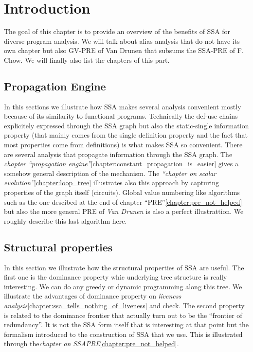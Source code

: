 \chapter{Introduction }
\label{chapter:analysis}

The goal of this chapter is to provide an overview of the benefits of SSA for diverse program analysis.
We will talk about alias analysis that do not have its own chapter but also GV-PRE of Van Drunen that subsums the SSA-PRE of F. Chow.
We will finally also list the chapters of this part.

\section{Propagation Engine}
In this sections we illustrate how SSA makes several analysis convenient mostly because of its similarity to functional programs. 
Technically the def-use chains explicitely expressed through the SSA graph but also the static-single information property (that mainly comes from the single definition property and the fact that most properties come from definitions) is what makes SSA so convenient.
There are several analysis that propagate information through the SSA graph.
The \emph{chapter ``propagation engine''}\ref{chapter:constant_propagation_is_easier} gives a somehow general description of the mechanism.
The \emph{``chapter on scalar evolution''}\ref{chapter:loop_tree} illustrates also this approach by capturing properties of the graph itself (circuits).
Global value numbering like algorithms such as the one descibed at the end of chapter ``PRE''\ref{chapter:pre_not_helped} but also the more general PRE of \emph{Van Drunen} is also a perfect illustrattion.
We roughly describe this last algorithm here.

\section{Structural properties}
In this section we illustrate how the structural properties of SSA are useful.
The first one is the dominance property whic underlying tree structure is really interesting.
We can do any greedy or dynamic programming along this tree.
We illustrate the advantages of dominance property on \emph{liveness analysis}\ref{chapter:ssa_tells_nothing_of_liveness} and check.
The second property is related to the dominance frontier that actually turn out to be the ``frontier of redundancy''.
It is not the SSA form itself that is interesting at that point but the formalism introduced to the construction of SSA that we use.
This is illustrated through the\emph{chapter on SSAPRE}\ref{chapter:pre_not_helped}.

